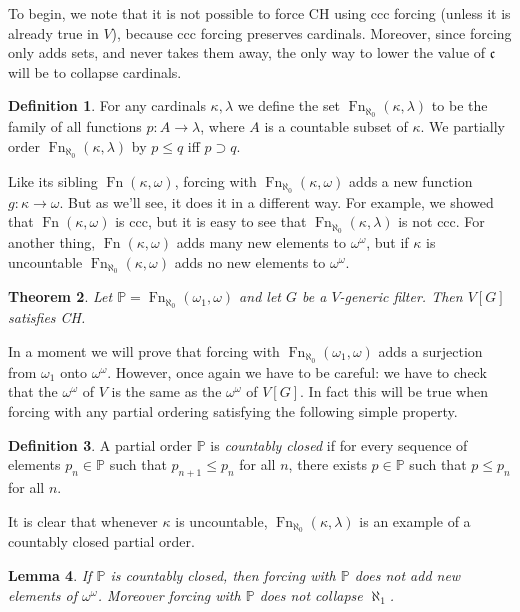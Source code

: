 \documentclass[11pt,oneside]{amsbook}
\newcommand{\PP}{\mathbb P}
\DeclareMathOperator{\Fn}{Fn}
\theoremstyle{definition}
\theoremstyle{plain}
\newtheorem{theorem}{Theorem}[section]
\newtheorem{lemma}[theorem]{Lemma}
\theoremstyle{definition}
\newtheorem{definition}[theorem]{Definition}
\theoremstyle{remark}
\numberwithin{equation}{section}
\numberwithin{figure}{section}
\begin{document}
To begin, we note that it is not possible to force CH using ccc forcing (unless it is already true in $V$), because ccc forcing preserves cardinals. Moreover, since forcing only adds sets, and never takes them away, the only way to lower the value of $\mathfrak c$ will be to collapse cardinals.

\begin{definition}
  For any cardinals $\kappa,\lambda$ we define the set $\Fn_{\aleph_0}(\kappa,\lambda)$ to be the family of all functions $p\colon A\to\lambda$, where $A$ is a countable subset of $\kappa$. We partially order $\Fn_{\aleph_0}(\kappa,\lambda)$ by $p\leq q$ iff $p\supset q$.
\end{definition}

Like its sibling  $\Fn(\kappa,\omega)$, forcing with $\Fn_{\aleph_0}(\kappa,\omega)$ adds a new function $g\colon\kappa\to\omega$. But as we'll see, it does it in a different way. For example, we showed that $\Fn(\kappa,\omega)$ is ccc, but it is easy to see that $\Fn_{\aleph_0}(\kappa,\lambda)$ is not ccc. For another thing, $\Fn(\kappa,\omega)$ adds many new elements to $\omega^\omega$, but if $\kappa$ is uncountable $\Fn_{\aleph_0}(\kappa,\omega)$ adds no new elements to $\omega^\omega$.

\begin{theorem}
  \label{thm:force-ch}
  Let $\PP=\Fn_{\aleph_0}(\omega_1,\omega)$ and let $G$ be a $V$-generic filter. Then $V[G]$ satisfies CH.
\end{theorem}

In a moment we will prove that forcing with $\Fn_{\aleph_0}(\omega_1,\omega)$ adds a surjection from $\omega_1$ onto $\omega^\omega$. However, once again we have to be careful: we have to check that the $\omega^\omega$ of $V$ is the same as the $\omega^\omega$ of $V[G]$. In fact this will be true when forcing with any partial ordering satisfying the following simple property.

\begin{definition}
  A partial order $\PP$ is \emph{countably closed} if for every sequence of elements $p_n\in\PP$ such that $p_{n+1}\leq p_n$ for all $n$, there exists $p\in\PP$ such that $p\leq p_n$ for all $n$.
\end{definition}

It is clear that whenever $\kappa$ is uncountable, $\Fn_{\aleph_0}(\kappa,\lambda)$ is an example of a countably closed partial order.

\begin{lemma}
  \label{lem:forcing-closed-preserves}
  If $\PP$ is countably closed, then forcing with $\PP$ does not add new elements of $\omega^\omega$. Moreover forcing with $\PP$ does not collapse $\aleph_1$.
\end{lemma}
\end{document}
